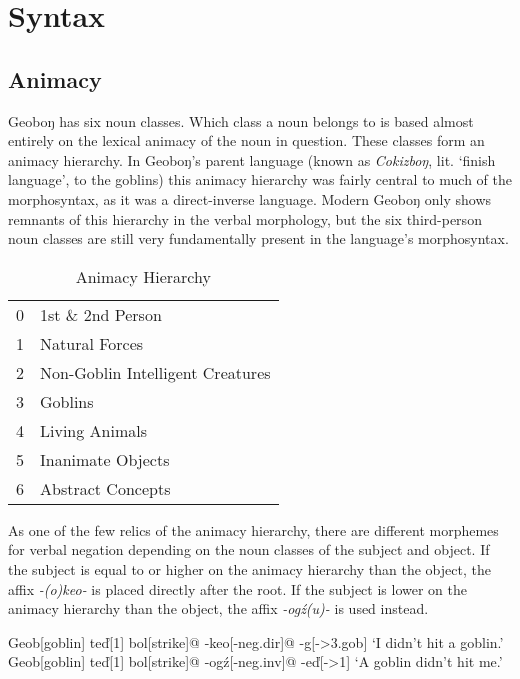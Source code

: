 \documentclass[a4paper,11pt,oneside,openany]{memoir}
\newcommand{\vd}{ď}
\newcommand{\engma}{ŋ}
\begin{document}
\chapter{Syntax}

\section{Animacy}

Geobo{\engma} has six noun classes. Which class a noun belongs to is based almost entirely on the lexical animacy of the noun in question. These classes form an animacy hierarchy. In Geobo{\engma}'s parent language (known as \textit{Cokizbo\engma}, lit. `finish language', to the goblins) this animacy hierarchy was fairly central to much of the morphosyntax, as it was a direct-inverse language. Modern Geobo{\engma} only shows remnants of this hierarchy in the verbal morphology, but the six third-person noun classes are still very fundamentally present in the language's morphosyntax.

\begin{table}[h]
    \centering
    \begin{tabular}{@{}rl@{}}
    \toprule
0 & 1st \& 2nd Person \\
1 & Natural Forces \\
2 & Non-Goblin Intelligent Creatures \\
3 & Goblins \\
4 & Living Animals \\
5 & Inanimate Objects \\
6 & Abstract Concepts \\
\bottomrule
\end{tabular}
    \caption{Animacy Hierarchy}
    \label{tab:anim}
\end{table}

As one of the few relics of the animacy hierarchy, there are different morphemes for verbal negation depending on the noun classes of the subject and object. If the subject is equal to or higher on the animacy hierarchy than the object, the affix \textit{-(o)keo-} is placed directly after the root. If the subject is lower on the animacy hierarchy than the object, the affix \textit{-og\'z(u)-} is used instead. 

\pex
\a
\begingl
Geob[goblin] 
te\vd[1]
bol[strike]@
-keo[-{\sc neg.dir}]@
-g[-{\sc >3.gob}]
\glft `I didn't hit a goblin.'
\endgl
\a
\begingl
Geob[goblin] 
te\vd[1]
bol[strike]@
-og\'z[-{\sc neg.inv}]@
-e\vd[-{\sc >1}]
\glft `A goblin didn't hit me.'
\endgl
\xe
\end{document}
